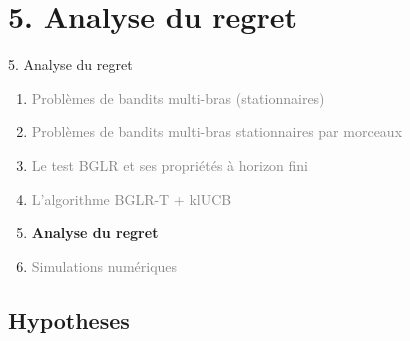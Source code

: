 \documentclass[11pt,french,ignorenonframetext,]{beamer}
\begin{document}
\section{\hfill{}5. Analyse du regret\hfill{}}

\begin{frame}{5. Analyse du regret}

  \begin{enumerate}
    \item
    \textcolor{gray}{
      Problèmes de bandits multi-bras (stationnaires)
    }
    \vspace*{15pt}

    \item
    \textcolor{gray}{
      Problèmes de bandits multi-bras stationnaires par morceaux
    }
    \vspace*{15pt}

    \item
    \textcolor{gray}{
      Le test BGLR et ses propriétés à horizon fini
    }
    \vspace*{15pt}

    \item
    \textcolor{gray}{
      L'algorithme BGLR-T + klUCB
    }
    \vspace*{15pt}

    \item
    \alert{\textbf{%
      Analyse du regret
    }}
    \vspace*{15pt}

    \item
    \textcolor{gray}{
      Simulations numériques
    }
  \end{enumerate}

\end{frame}

\subsection{\hfill{}Hypotheses\hfill{}}
\end{document}
